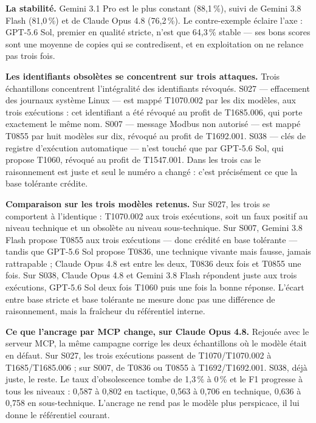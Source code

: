 \textbf{La stabilité.} Gemini 3.1 Pro est le plus constant (88,1\,\%), suivi de Gemini 3.8 Flash (81,0\,\%) et de Claude Opus 4.8 (76,2\,\%). Le contre-exemple éclaire l'axe : GPT-5.6 Sol, premier en qualité stricte, n'est que 64,3\,\% stable --- ses bons scores sont une moyenne de copies qui se contredisent, et en exploitation on ne relance pas trois fois.


\textbf{Les identifiants obsolètes se concentrent sur trois attaques.} Trois échantillons concentrent l'intégralité des identifiants révoqués. S027 --- effacement des journaux système Linux --- est mappé T1070.002 par les dix modèles, aux trois exécutions : cet identifiant a été révoqué au profit de T1685.006, qui porte exactement le même nom. S007 --- message Modbus non autorisé --- est mappé T0855 par huit modèles sur dix, révoqué au profit de T1692.001. S038 --- clés de registre d'exécution automatique --- n'est touché que par GPT-5.6 Sol, qui propose T1060, révoqué au profit de T1547.001. Dans les trois cas le raisonnement est juste et seul le numéro a changé : c'est précisément ce que la base tolérante crédite.

\textbf{Comparaison sur les trois modèles retenus.} Sur S027, les trois se comportent à l'identique : T1070.002 aux trois exécutions, soit un faux positif au niveau technique et un obsolète au niveau sous-technique. Sur S007, Gemini 3.8 Flash propose T0855 aux trois exécutions --- donc crédité en base tolérante --- tandis que GPT-5.6 Sol propose T0836, une technique vivante mais fausse, jamais rattrapable ; Claude Opus 4.8 est entre les deux, T0836 deux fois et T0855 une fois. Sur S038, Claude Opus 4.8 et Gemini 3.8 Flash répondent juste aux trois exécutions, GPT-5.6 Sol deux fois T1060 puis une fois la bonne réponse. L'écart entre base stricte et base tolérante ne mesure donc pas une différence de raisonnement, mais la fraîcheur du référentiel interne.

\textbf{Ce que l'ancrage par MCP change, sur Claude Opus 4.8.} Rejouée avec le serveur MCP, la même campagne corrige les deux échantillons où le modèle était en défaut. Sur S027, les trois exécutions passent de T1070/T1070.002 à T1685/T1685.006 ; sur S007, de T0836 ou T0855 à T1692/T1692.001. S038, déjà juste, le reste. Le taux d'obsolescence tombe de 1,3\,\% à 0\,\% et le F1 progresse à tous les niveaux : 0,587 à 0,802 en tactique, 0,563 à 0,706 en technique, 0,636 à 0,758 en sous-technique. L'ancrage ne rend pas le modèle plus perspicace, il lui donne le référentiel courant.

